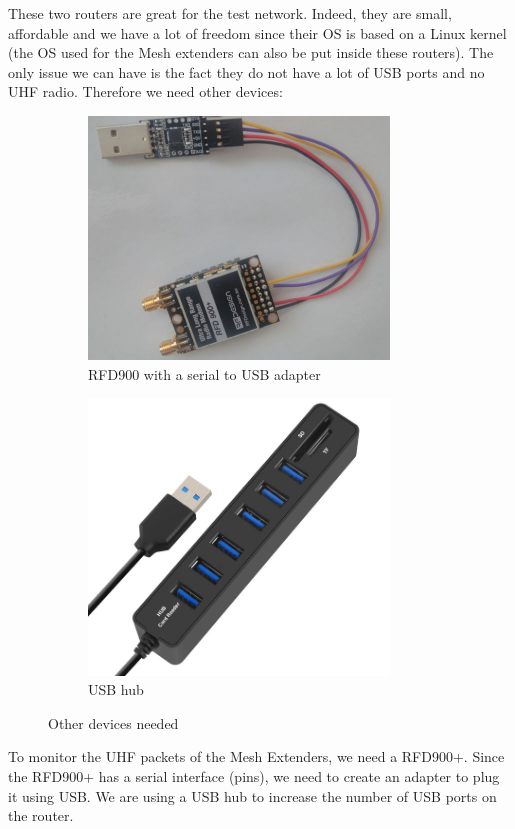 These two routers are great for the test network. Indeed, they are small, affordable and we have a lot of freedom since their OS is based on a Linux kernel (the OS used for the Mesh extenders can also be put inside these routers).
The only issue we can have is the fact they do not have a lot of USB ports and no UHF radio. Therefore we need other devices:
\begin{figure}[H]
\centering
\begin{subfigure}{.5\textwidth}
  \centering
	\includegraphics[width=8cm]{image/rfd900.jpg}%
	\caption{RFD900 with a serial to USB adapter}%
	\label{figure:RFD900}%
\end{subfigure}%
\begin{subfigure}{.5\textwidth}
  \centering
  \includegraphics[width=8cm]{image/usbhub.jpg}%
	\caption{USB hub}%
	\label{figure:UsbHub}%
\end{subfigure}
\caption{Other devices needed}
\label{fig:devices}
\end{figure}

To monitor the UHF packets of the Mesh Extenders, we need a RFD900+. Since the RFD900+ has a serial interface (pins), we need to create an adapter to plug it using USB.
We are using a USB hub to increase the number of USB ports on the router.

